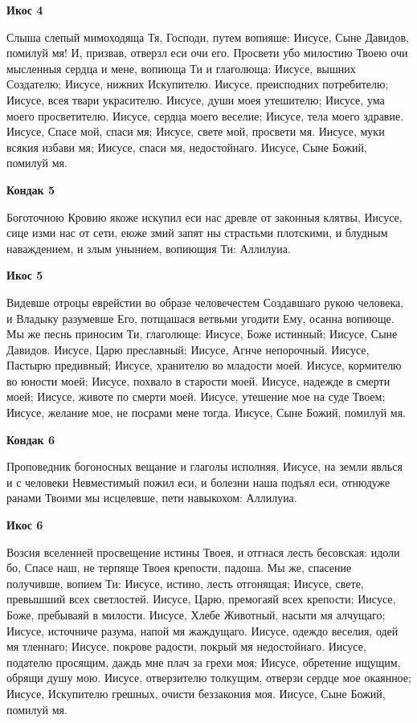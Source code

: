 \bfseries Икос 4\normalfont{}


Слыша слепый мимоходяща Тя, Господи, путем вопияше: Иисусе, Сыне Давидов, помилуй мя! И, призвав, отверзл еси очи его. Просвети убо милостию Твоею очи мысленныя сердца и мене, вопиюща Ти и глаголюща: Иисусе, вышних Создателю; Иисусе, нижних Искупителю. Иисусе, преисподних потребителю; Иисусе, всея твари украсителю. Иисусе, души моея утешителю; Иисусе, ума моего просветителю. Иисусе, сердца моего веселие; Иисусе, тела моего здравие. Иисусе, Спасе мой, спаси мя; Иисусе, свете мой, просвети мя. Иисусе, муки всякия избави мя; Иисусе, спаси мя, недостойнаго. Иисусе, Сыне Божий, помилуй мя.


\medskip


\bfseries Кондак 5\normalfont{}


Боготочною Кровию якоже искупил еси нас древле от законныя клятвы, Иисусе, сице изми нас от сети, еюже змий запят ны страстьми плотскими, и блудным наваждением, и злым унынием, вопиющия Ти: Аллилуиа.


\medskip


\bfseries Икос 5\normalfont{}


Видевше отроцы еврейстии во образе человечестем Создавшаго рукою человека, и Владыку разумевше Его, потщашася ветвьми угодити Ему, осанна вопиюще. Мы же песнь приносим Ти, глаголюще: Иисусе, Боже истинный; Иисусе, Сыне Давидов. Иисусе, Царю преславный; Иисусе, Агнче непорочный. Иисусе, Пастырю предивный; Иисусе, хранителю во младости моей. Иисусе, кормителю во юности моей; Иисусе, похвало в старости моей. Иисусе, надежде в смерти моей; Иисусе, животе по смерти моей. Иисусе, утешение мое на суде Твоем; Иисусе, желание мое, не посрами мене тогда. Иисусе, Сыне Божий, помилуй мя.


\medskip


\bfseries Кондак 6\normalfont{}


Проповедник богоносных вещание и глаголы исполняя, Иисусе, на земли явлься и с человеки Невместимый пожил еси, и болезни наша подъял еси, отнюдуже ранами Твоими мы исцелевше, пети навыкохом: Аллилуиа.


\medskip


\bfseries Икос 6\normalfont{}


Возсия вселенней просвещение истины Твоея, и отгнася лесть бесовская: идоли бо, Спасе наш, не терпяще Твоея крепости, падоша. Мы же, спасение получивше, вопием Ти: Иисусе, истино, лесть отгонящая; Иисусе, свете, превышший всех светлостей. Иисусе, Царю, премогаяй всех крепости; Иисусе, Боже, пребываяй в милости. Иисусе, Хлебе Животный, насыти мя алчущаго; Иисусе, источниче разума, напой мя жаждущаго. Иисусе, одеждо веселия, одей мя тленнаго; Иисусе, покрове радости, покрый мя недостойнаго. Иисусе, подателю просящим, даждь мне плач за грехи моя; Иисусе, обретение ищущим, обрящи душу мою. Иисусе, отверзителю толкущим, отверзи сердце мое окаянное; Иисусе, Искупителю грешных, очисти беззакония моя. Иисусе, Сыне Божий, помилуй мя.


